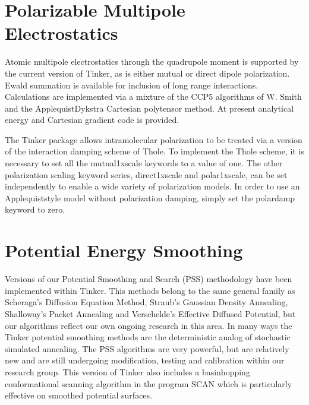 \documentclass[letterpaper,11pt,english]{sphinxmanual}
\begin{document}
\section{Polarizable Multipole Electrostatics}
\label{\detokenize{text/special-features:polarizable-multipole-electrostatics}}
Atomic multipole electrostatics through the quadrupole moment is supported by the current version of Tinker, as is either mutual or direct dipole polarization. Ewald summation is available for inclusion of long range interactions. Calculations are implemented via a mixture of the CCP5 algorithms of W. Smith and the Applequist\sphinxhyphen{}Dykstra Cartesian polytensor method. At present analytical energy and Cartesian gradient code is provided.

The Tinker package allows intramolecular polarization to be treated via a version of the interaction damping scheme of Thole. To implement the Thole scheme, it is necessary to set all the mutual\sphinxhyphen{}1x\sphinxhyphen{}scale keywords to a value of one. The other polarization scaling keyword series, direct\sphinxhyphen{}1x\sphinxhyphen{}scale and polar\sphinxhyphen{}1x\sphinxhyphen{}scale, can be set independently to enable a wide variety of polarization models. In order to use an Applequist\sphinxhyphen{}style model without polarization damping, simply set the polar\sphinxhyphen{}damp keyword to zero.


\section{Potential Energy Smoothing}
\label{\detokenize{text/special-features:potential-energy-smoothing}}
Versions of our Potential Smoothing and Search (PSS) methodology have been implemented within Tinker. This methods belong to the same general family as Scheraga’s Diffusion Equation Method, Straub’s Gaussian Density Annealing, Shalloway’s Packet Annealing and Verschelde’s Effective Diffused Potential, but our algorithms reflect our own ongoing research in this area. In many ways the Tinker potential smoothing methods are the deterministic analog of stochastic simulated annealing. The PSS algorithms are very powerful, but are relatively new and are still undergoing modification, testing and calibration within our research group. This version of Tinker also includes a basin\sphinxhyphen{}hopping conformational scanning algorithm in the program SCAN which is particularly effective on smoothed potential surfaces.
\end{document}
